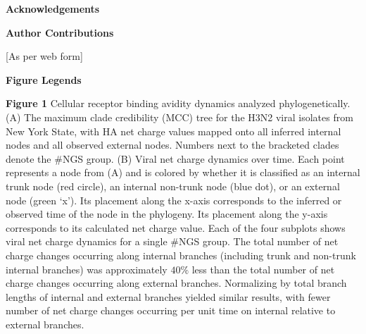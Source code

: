 \documentclass[12pt,a4paper]{article}
\begin{document}
{\bf Acknowledgements}


{\bf Author Contributions}

[As per web form]

{\bf Figure Legends}


{\bf Figure 1}  Cellular receptor binding avidity dynamics analyzed phylogenetically. (A) The maximum clade credibility (MCC) tree for the H3N2 viral isolates from New York State, with HA net charge values mapped onto all inferred internal nodes and all observed external nodes. Numbers next to the bracketed clades denote the #NGS group. (B) Viral net charge dynamics over time. Each point represents a node from (A) and is colored by whether it is classified as an internal trunk node (red circle), an internal non-trunk node (blue dot), or an external node (green ‘x’). Its placement along the x-axis corresponds to the inferred or observed time of the node in the phylogeny. Its placement along the y-axis corresponds to its calculated net charge value. Each of the four subplots shows viral net charge dynamics for a single #NGS group. The total number of net charge changes occurring along internal branches (including trunk and non-trunk internal branches) was approximately $40\%$ less than the total number of net charge changes occurring along external branches. Normalizing by total branch lengths of internal and external branches yielded similar results, with fewer number of net charge changes occurring per unit time on internal relative to external branches.
\end{document}
